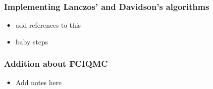 \documentclass{beamer}
\begin{document}
\begin{frame}
\frametitle{Implementing Lanczos' and Davidson's algorithms}

\begin{block}{}
\begin{itemize}
\item add references to this

\item baby steps
\end{itemize}

\noindent
\end{block}
\end{frame}

\begin{frame}
\frametitle{Addition about FCIQMC}

\begin{block}{}
\begin{itemize}
\item Add notes here
\end{itemize}

\noindent
\end{block}
\end{frame}
\end{document}
